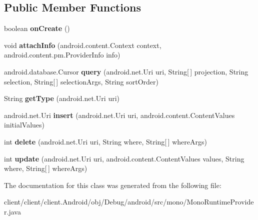 \subsection*{Public Member Functions}
\begin{DoxyCompactItemize}
\item 
\hypertarget{classmono_1_1MonoRuntimeProvider_ac5640d3ce8472accc1953fe591e683c3}{}boolean {\bfseries on\+Create} ()\label{classmono_1_1MonoRuntimeProvider_ac5640d3ce8472accc1953fe591e683c3}

\item 
\hypertarget{classmono_1_1MonoRuntimeProvider_a4fb9f5a38268fb642d211e7ef0fd9228}{}void {\bfseries attach\+Info} (android.\+content.\+Context context, android.\+content.\+pm.\+Provider\+Info info)\label{classmono_1_1MonoRuntimeProvider_a4fb9f5a38268fb642d211e7ef0fd9228}

\item 
\hypertarget{classmono_1_1MonoRuntimeProvider_a5f038667e16324d54f940968f4abd86f}{}android.\+database.\+Cursor {\bfseries query} (android.\+net.\+Uri uri, String\mbox{[}$\,$\mbox{]} projection, String selection, String\mbox{[}$\,$\mbox{]} selection\+Args, String sort\+Order)\label{classmono_1_1MonoRuntimeProvider_a5f038667e16324d54f940968f4abd86f}

\item 
\hypertarget{classmono_1_1MonoRuntimeProvider_ab7978ccd79378f86aabc9a1997bff129}{}String {\bfseries get\+Type} (android.\+net.\+Uri uri)\label{classmono_1_1MonoRuntimeProvider_ab7978ccd79378f86aabc9a1997bff129}

\item 
\hypertarget{classmono_1_1MonoRuntimeProvider_afbf0b2575d76132ac379064f3f695013}{}android.\+net.\+Uri {\bfseries insert} (android.\+net.\+Uri uri, android.\+content.\+Content\+Values initial\+Values)\label{classmono_1_1MonoRuntimeProvider_afbf0b2575d76132ac379064f3f695013}

\item 
\hypertarget{classmono_1_1MonoRuntimeProvider_a20fd29ee82e2fbc6ca8e3a7d53e89b9f}{}int {\bfseries delete} (android.\+net.\+Uri uri, String where, String\mbox{[}$\,$\mbox{]} where\+Args)\label{classmono_1_1MonoRuntimeProvider_a20fd29ee82e2fbc6ca8e3a7d53e89b9f}

\item 
\hypertarget{classmono_1_1MonoRuntimeProvider_a70342b01de97d26ab215db961f4a714c}{}int {\bfseries update} (android.\+net.\+Uri uri, android.\+content.\+Content\+Values values, String where, String\mbox{[}$\,$\mbox{]} where\+Args)\label{classmono_1_1MonoRuntimeProvider_a70342b01de97d26ab215db961f4a714c}

\end{DoxyCompactItemize}


The documentation for this class was generated from the following file\+:\begin{DoxyCompactItemize}
\item 
client/client/client.\+Android/obj/\+Debug/android/src/mono/Mono\+Runtime\+Provider.\+java\end{DoxyCompactItemize}
